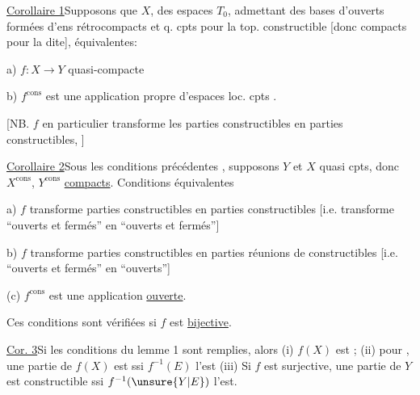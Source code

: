 \uline{Corollaire 1}\quad Supposons que $X$,    des espaces $T_0$,  admettant des bases d'ouverts formées d'ens  rétrocompacts et q. cpts pour la top. constructible [donc compacts pour la dite],   équivalentes:

a) $f:X\longrightarrow Y$    quasi-compacte

\deleted{[\unsure{si} cpt $X$}\quad {} b) $f^{\mathrm{cons}}$ est une  application propre d'espaces loc. cpts .



[NB. $f$ en particulier transforme les parties constructibles en parties constructibles, ]

\uline{Corollaire 2}\quad Sous les conditions précédentes , supposons $Y$ et $X$ quasi cpts, donc $X^{\mathrm{cons}}$, $Y^{\mathrm{cons}}$ \uline{compacts}. Conditions équivalentes

a) $f$ transforme parties constructibles en parties constructibles [i.e. transforme ``ouverts et fermés'' en ``ouverts et fermés'']

b) $f$ transforme parties constructibles en parties réunions de constructibles [i.e. ``ouverts et fermés'' en ``ouverts'']

(c) $f^{\mathrm{cons}}$ est une application \uline{ouverte}. 

Ces conditions sont vérifiées si $f$ est \uline{bijective}.

\uline{Cor. 3}\quad Si les conditions du lemme 1 sont remplies, alors (i) $f(X)$ est ; (ii) pour , une partie  de $f(X)$ est  ssi $f^{-1}(E)$ l'est (iii) Si $f$ est surjective, une partie de $Y$ est constructible ssi $f^{-1}(\unsure{Y|E})$ l'est.

